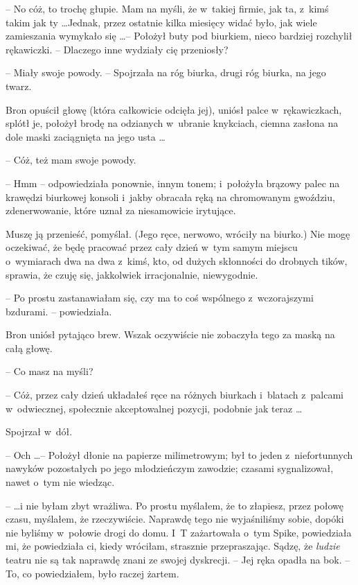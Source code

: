 \documentclass[oneside,polish,11pt,rmheadings]{mwbk}
\begin{document}
-- No cóż, to trochę głupie. Mam na myśli, że w~takiej firmie, jak ta, z~kimś takim jak ty \ldots  Jednak, przez ostatnie kilka miesięcy widać było, jak wiele zamieszania wymykało się \ldots  -- Położył buty pod biurkiem, nieco bardziej rozchylił rękawiczki. -- Dlaczego inne wydziały cię przeniosły? 

-- Miały swoje powody. -- Spojrzała na róg biurka, drugi róg biurka, na jego twarz. 

Bron opuścił głowę (która całkowicie odcięła jej), uniósł palce w~rękawiczkach, splótł je, położył brodę na odzianych w~ubranie knykciach, ciemna zasłona na dole maski zaciągnięta na jego usta \ldots  

-- Cóż, też mam swoje powody.  

-- Hmm -- odpowiedziała ponownie, innym tonem; i~położyła brązowy palec na krawędzi biurkowej konsoli i~jakby obracała ręką na chromowanym gwoździu, zdenerwowanie, które uznał za niesamowicie irytujące. 

Muszę ją przenieść, pomyślał. (Jego ręce, nerwowo, wróciły na biurko.) Nie mogę oczekiwać, że będę pracować przez cały dzień w~tym samym miejscu o~wymiarach dwa na dwa z~kimś, kto, od dużych skłonności do drobnych tików, sprawia, że czuję się, jakkolwiek irracjonalnie, niewygodnie. 

-- Po prostu zastanawiałam się, czy ma to coś wspólnego z~wczorajszymi bzdurami. -- powiedziała.  

Bron uniósł pytająco brew. Wszak oczywiście nie zobaczyła tego za maską na całą głowę. 

-- Co masz na myśli? 

-- Cóż, przez cały dzień układałeś ręce na różnych biurkach i~blatach z~palcami w~odwiecznej, społecznie akceptowalnej pozycji, podobnie jak teraz \ldots  

Spojrzał w~dół. 

-- Och \ldots  -- Położył dłonie na papierze milimetrowym; był to jeden z~niefortunnych nawyków pozostałych po jego młodzieńczym zawodzie; czasami sygnalizował, nawet o~tym nie wiedząc. 

--  \ldots i nie byłam zbyt wrażliwa. Po prostu myślałem, że to złapiesz, przez połowę czasu, myślałem, że rzeczywiście. Naprawdę tego nie wyjaśniliśmy sobie, dopóki nie byliśmy w~połowie drogi do domu. I~T zażartowała o~tym Spike, powiedziała mi, że powiedziała ci, kiedy wróciłam, strasznie przepraszając. Sądzę, że \textit{ludzie } teatru nie są tak naprawdę znani ze swojej dyskrecji. -- Jej ręka opadła na bok. -- To, co powiedziałem, było raczej żartem. 
\end{document}
